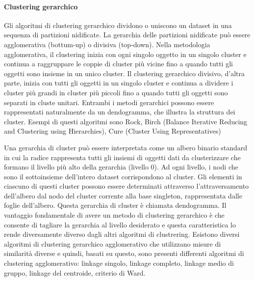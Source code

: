 \documentclass[12pt, a4paper, italian]{report}
\numberwithin{figure}{chapter}
\numberwithin{table}{chapter}
\begin{document}
\paragraph{Clustering gerarchico} 
Gli algoritmi di clustering gerarchico dividono o uniscono un dataset in una sequenza di partizioni nidificate. La gerarchia delle partizioni nidificate può essere agglomerativa (bottum-up) o divisiva (top-down). Nella metodologia agglomerativa, il clustering inizia con ogni singolo oggetto in un singolo cluster e continua a raggruppare le coppie di cluster più vicine fino a quando tutti gli oggetti sono insieme in un unico cluster. Il clustering gerarchico divisivo, d'altra parte, inizia con tutti gli oggetti in un singolo cluster e continua a dividere i cluster più grandi in cluster più piccoli fino a quando tutti gli oggetti sono separati in cluste unitari. Entrambi i metodi gerarchici possono essere rappresentati naturalmente da un dendogramma, che illustra la struttura dei cluster. Esempi di questi algoritmi sono Rock, Birch (Balance Iterative Reducing and Clustering using Hierarchies), Cure (Cluster Using Representatives)

Una gerarchia di cluster può essere interpretata come un albero binario standard in cui la radice rappresenta tutti gli insiemi di oggetti dati da clusterizzare che formano il livello più alto della gerarchia (livello 0). Ad ogni livello, i nodi che sono il sottoinsieme dell'intero dataset corrispondono al cluster. Gli elementi in ciascuno di questi cluster possono essere determinati attraverso l'attraversamento dell'albero dal nodo del cluster corrente alla base singleton, rappresentata dalle foglie dell'albero. Questa gerarchia di cluster è chiamata dendogramma. Il vantaggio fondamentale di avere un metodo di clustering gerarchico è che consente di tagliare la gerarchia al livello desiderato e questa caratteristica lo rende diversamente diverso dagli altri algoritmi di clustrering. Esistono diversi algoritmi di clustering gerarchico agglomerativo che utilizzano misure di similarità diverse e quindi, basati su questo, sono presenti differenti algoritmi di clustering agglomerativo: linkage singolo, linkage completo, linkage medio di gruppo, linkage del centroide, criterio di Ward.
\end{document}
